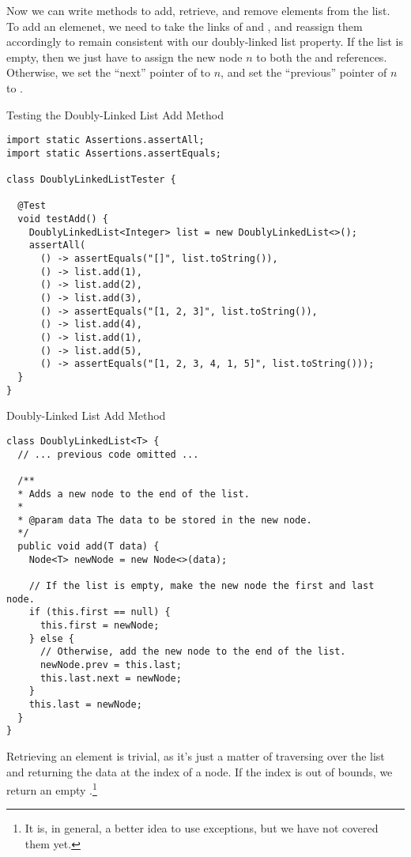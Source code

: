Now we can write methods to add, retrieve, and remove elements from the list. To add an elemenet, we need to take the links of  and , and reassign them accordingly to remain consistent with our doubly-linked list property. If the list is empty, then we just have to assign the new node $n$ to both the  and  references. Otherwise, we set the ``next'' pointer of  to $n$, and set the ``previous'' pointer of $n$ to . 

\begin{cl}{Testing the Doubly-Linked List Add Method}
\begin{lstlisting}[language=MyJava]
import static Assertions.assertAll;
import static Assertions.assertEquals;

class DoublyLinkedListTester {

  @Test
  void testAdd() {
    DoublyLinkedList<Integer> list = new DoublyLinkedList<>();
    assertAll(
      () -> assertEquals("[]", list.toString()),
      () -> list.add(1),
      () -> list.add(2),
      () -> list.add(3),
      () -> assertEquals("[1, 2, 3]", list.toString()),
      () -> list.add(4),
      () -> list.add(1),
      () -> list.add(5),
      () -> assertEquals("[1, 2, 3, 4, 1, 5]", list.toString()));
  }
}
\end{lstlisting}
\end{cl}

\begin{cl}{Doubly-Linked List Add Method}
\begin{lstlisting}[language=MyJava]
class DoublyLinkedList<T> {
  // ... previous code omitted ...

  /**
  * Adds a new node to the end of the list.
  *
  * @param data The data to be stored in the new node.
  */
  public void add(T data) {
    Node<T> newNode = new Node<>(data);

    // If the list is empty, make the new node the first and last node.
    if (this.first == null) {
      this.first = newNode;
    } else {
      // Otherwise, add the new node to the end of the list.
      newNode.prev = this.last;
      this.last.next = newNode;
    }
    this.last = newNode;
  }
}
\end{lstlisting}
\end{cl}

Retrieving an element is trivial, as it's just a matter of traversing over the list and returning the data at the index of a node. If the index is out of bounds, we return an empty .\footnote{It is, in general, a better idea to use exceptions, but we have not covered them yet.}

